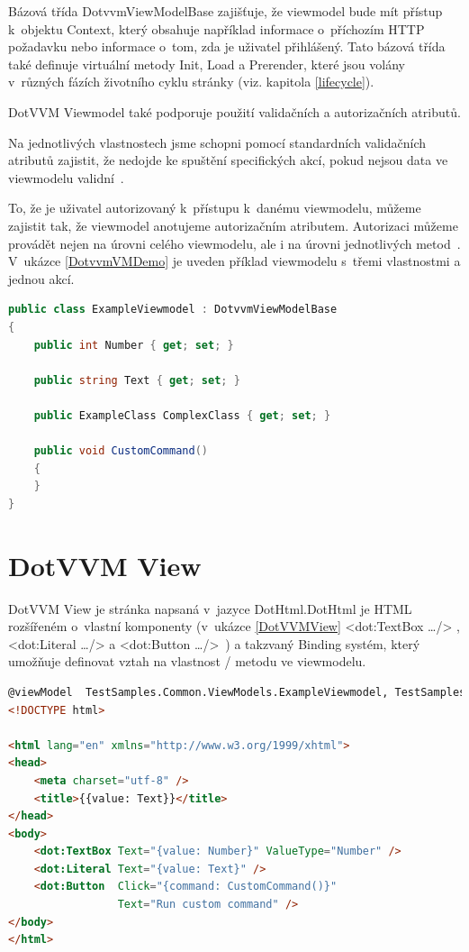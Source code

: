 Bázová třída DotvvmViewModelBase zajišťuje, že viewmodel bude mít přístup k~objektu Context, který obsahuje například informace o~příchozím HTTP požadavku nebo informace o~tom, zda je uživatel přihlášený.
Tato bázová třída také definuje virtuální metody Init, Load a Prerender, které jsou volány v~různých fázích životního cyklu stránky (viz. kapitola \ref{lifecycle}).

DotVVM Viewmodel také podporuje použití validačních a autorizačních atributů.

Na jednotlivých vlastnostech jsme schopni pomocí standardních validačních atributů zajistit, že nedojde ke spuštění specifických akcí, pokud nejsou data ve viewmodelu validní~\cite{DotVVM-Validation}. 

To, že je uživatel autorizovaný k~přístupu k~danému viewmodelu, můžeme zajistit tak, že viewmodel anotujeme autorizačním atributem. Autorizaci můžeme provádět nejen na úrovni celého viewmodelu, ale i na úrovni jednotlivých metod~\cite{DotvvmAuth}. V~ukázce \ref{DotvvmVMDemo} je uveden příklad viewmodelu s~třemi vlastnostmi a jednou akcí.

\begin{lstlisting}[language=c#, caption=Ukázka DotVVM Viewmodelu,label=DotvvmVMDemo,captionpos=t]
public class ExampleViewmodel : DotvvmViewModelBase
{
    public int Number { get; set; }

    public string Text { get; set; }

    public ExampleClass ComplexClass { get; set; }

    public void CustomCommand() 
    {
    }
}
\end{lstlisting}


\section{DotVVM View}
DotVVM View je stránka napsaná v~jazyce DotHtml.DotHtml je HTML rozšířeném o~vlastní komponenty (v~ukázce \ref{DotVVMView} <dot:TextBox \ldots /> , <dot:Literal \ldots /> a <dot:Button \ldots />~) a takzvaný Binding systém, který umožňuje definovat vztah na vlastnost / metodu ve viewmodelu.

\begin{lstlisting}[language=html, caption=Ukázka DotHtml,captionpos=t,label=DotVVMView]
@viewModel  TestSamples.Common.ViewModels.ExampleViewmodel, TestSamples.Common
<!DOCTYPE html>

<html lang="en" xmlns="http://www.w3.org/1999/xhtml">
<head>
    <meta charset="utf-8" />
    <title>{{value: Text}}</title>
</head>
<body>
    <dot:TextBox Text="{value: Number}" ValueType="Number" />
    <dot:Literal Text="{value: Text}" />
    <dot:Button  Click="{command: CustomCommand()}"
                 Text="Run custom command" />
</body>
</html>
\end{lstlisting}

